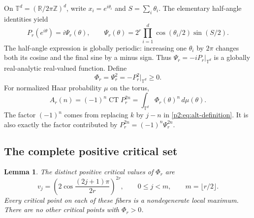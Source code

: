 \documentclass[11pt,a4paper]{article}
\newtheorem{lemma}[theorem]{Lemma}
\theoremstyle{definition}
\theoremstyle{remark}
\numberwithin{equation}{section}
\begin{document}
On $\mathbb T^d=(\mathbb R/2\pi\mathbb Z)^d$, write
$x_i=e^{i\theta_i}$ and $S=\sum_i\theta_i$. The elementary half-angle
identities yield
\begin{equation}\label{p2:eq:alt-real-function}
 P_r(e^{i\theta})=i\Psi_r(\theta),\qquad
 \Psi_r(\theta)=2^r\prod_{i=1}^{d}\cos(\theta_i/2)\sin(S/2).
\end{equation}
The half-angle expression is globally periodic: increasing one
$\theta_i$ by $2\pi$ changes both its cosine and the final sine by a
minus sign. Thus $\Psi_r=-iP_r|_{\mathbb T^d}$ is a globally real-analytic
real-valued function. Define
\begin{equation}\label{p2:eq:alt-positive-function}
 \Phi_r=\Psi_r^2=-P_r^2|_{\mathbb T^d}\geq0.
\end{equation}
For normalized Haar probability $\mu$ on the torus,
\begin{equation}\label{p2:eq:alt-positive-moment}
 A_r(n)=(-1)^n\operatorname{CT}P_r^{2n}
       =\int_{\mathbb T^d}\Phi_r(\theta)^n\,d\mu(\theta).
\end{equation}
The factor $(-1)^n$ comes from replacing $k$ by $j-n$ in
\eqref{p2:eq:alt-definition}. It is also exactly the factor contributed
by $P_r^{2n}=(-1)^n\Psi_r^{2n}$.

\subsection{The complete positive critical set}

\begin{lemma}\label{p2:lem:alt-critical-values}
The distinct positive critical values of $\Phi_r$ are
\begin{equation}\label{p2:eq:alt-values}
 v_j=\left(2\cos\frac{(2j+1)\pi}{2r}\right)^{2r},
 \qquad 0\leq j<m,\qquad m=\lfloor r/2\rfloor.
\end{equation}
Every critical point on each of these fibers is a nondegenerate local
maximum. There are no other critical points with $\Phi_r>0$.
\end{lemma}
\end{document}
